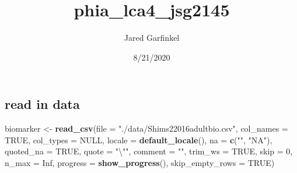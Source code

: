 \documentclass[
]{article}
\title{phia\_lca4\_jsg2145}
\author{Jared Garfinkel}
\date{8/21/2020}
\newenvironment{Shaded}{\begin{snugshade}}{\end{snugshade}}
\newcommand{\CharTok}[1]{\textcolor[rgb]{0.31,0.60,0.02}{#1}}
\newcommand{\DataTypeTok}[1]{\textcolor[rgb]{0.13,0.29,0.53}{#1}}
\newcommand{\DecValTok}[1]{\textcolor[rgb]{0.00,0.00,0.81}{#1}}
\newcommand{\KeywordTok}[1]{\textcolor[rgb]{0.13,0.29,0.53}{\textbf{#1}}}
\newcommand{\NormalTok}[1]{#1}
\newcommand{\OtherTok}[1]{\textcolor[rgb]{0.56,0.35,0.01}{#1}}
\newcommand{\StringTok}[1]{\textcolor[rgb]{0.31,0.60,0.02}{#1}}
\begin{document}
\maketitle

\hypertarget{read-in-data}{%
\subsection{read in data}\label{read-in-data}}

\begin{Shaded}
\begin{Highlighting}[]
\NormalTok{biomarker <-}\StringTok{ }\KeywordTok{read_csv}\NormalTok{(}\DataTypeTok{file =} \StringTok{"./data/Shims22016adultbio.csv"}\NormalTok{,}
                      \DataTypeTok{col_names =} \OtherTok{TRUE}\NormalTok{, }
                      \DataTypeTok{col_types =} \OtherTok{NULL}\NormalTok{,}
                      \DataTypeTok{locale =} \KeywordTok{default_locale}\NormalTok{(), }
                      \DataTypeTok{na =} \KeywordTok{c}\NormalTok{(}\StringTok{""}\NormalTok{, }\StringTok{"NA"}\NormalTok{), }
                      \DataTypeTok{quoted_na =} \OtherTok{TRUE}\NormalTok{,}
                      \DataTypeTok{quote =} \StringTok{"}\CharTok{\textbackslash{}"}\StringTok{"}\NormalTok{, }
                      \DataTypeTok{comment =} \StringTok{""}\NormalTok{, }
                      \DataTypeTok{trim_ws =} \OtherTok{TRUE}\NormalTok{, }
                      \DataTypeTok{skip =} \DecValTok{0}\NormalTok{,}
                      \DataTypeTok{n_max =} \OtherTok{Inf}\NormalTok{, }
                      \DataTypeTok{progress =} \KeywordTok{show_progress}\NormalTok{(), }
                      \DataTypeTok{skip_empty_rows =} \OtherTok{TRUE}\NormalTok{)}
\end{Highlighting}
\end{Shaded}
\end{document}
